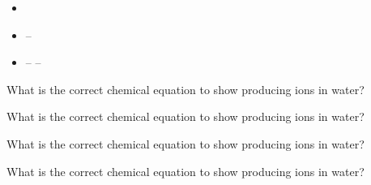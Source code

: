 \documentclass[11pt,addpoints]{exam}   	%
\begin{document}
\begin{questions}
\begin{solution}
\begin{itemize}
\item {}
\item {}\hspace{-0.5em}--\hspace{-0.75em}
\item {}\hspace{-0.5em} -- \hspace{-0.75em}\hspace{-0.5em} -- \hspace{-0.75em}
\end{itemize}
\end{solution}

\question[5] What is the correct chemical equation to show  producing  ions in water?

\begin{solution}
\end{solution}

\question[5] What is the correct chemical equation to show  producing  ions in water?

\begin{solution}
\end{solution}

\question[5] What is the correct chemical equation to show  producing  ions in water?

\begin{solution}
\end{solution}

\clearpage
\question[5] What is the correct chemical equation to show  producing  ions in water?

\begin{solution}
\end{solution}


\end{questions}
\end{document}
